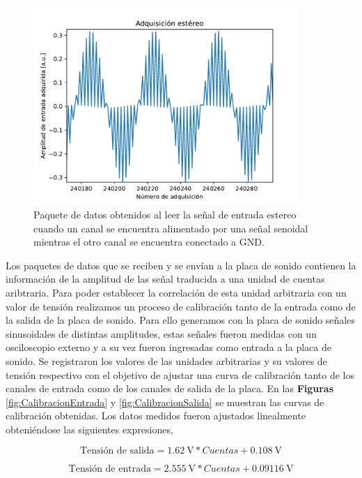 \documentclass[a4paper,11pt]{article}
\begin{document}
    \begin{figure}[!h] 
        \centering
        \includegraphics[width=0.9\textwidth]{imagenes/estereo.pdf}
        \caption{Paquete de datos obtenidos al leer la señal de entrada
estereo cuando un canal se encuentra alimentado por una señal senoidal
mientras el otro canal se encuentra conectado a GND.}
        \label{fig:multiplexado} 
    \end{figure}

Los paquetes de datos que se reciben y se envían a la placa de sonido
contienen la información de la amplitud de las señal traducida a una
unidad de cuentas aribtraria. Para poder establecer la correlación de
esta unidad arbitraria con un valor de tensión realizamos un proceso de
calibración tanto de la entrada como de la salida de la placa de sonido.
Para ello generamos con la placa de sonido señales sinusoidales de
distintas amplitudes, estas señales fueron medidas con un osciloscopio
externo y a su vez fueron ingresadas como entrada a la placa de sonido.
Se registraron los valores de las unidades arbitrarias y su valores de
tensión respectivo con el objetivo de ajustar una curva de calibración
tanto de los canales de entrada como de los canales de salida de la
placa.  En las \textbf{Figuras} \ref{fig:CalibracionEntrada} y
\ref{fig:CalibracionSalida} se muestran las curvas de calibración
obtenidas.  Los datos medidos fueron ajustados linealmente obteniéndose
las siguientes expresiones,
	
\begin{equation*}
	 \text{Tensión de salida} = \SI{1.62}{\V} * Cuentas + \SI{0.108}{\V}
\end{equation*}

\begin{equation*}
	\text{Tensión de entrada} = \SI{2.555}{\V} * Cuentas + \SI{0.09116}{\V}
\end{equation*}
\end{document}
